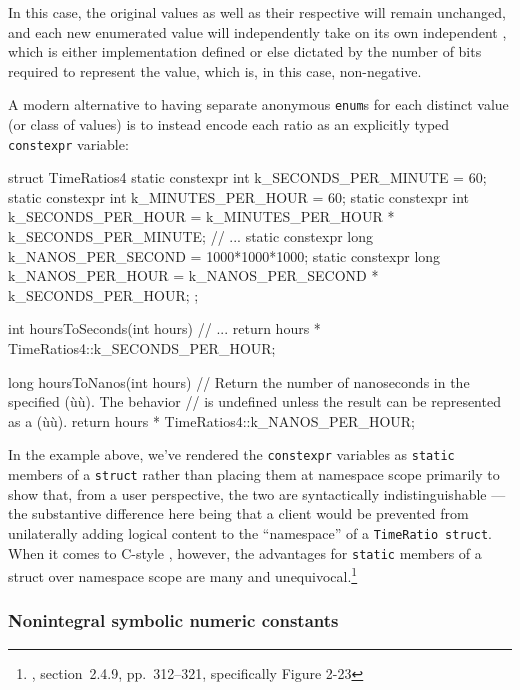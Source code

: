 \noindent In this case, the original values as well as their respective  will
remain unchanged, and each new enumerated value will independently take
on its own independent , which is either implementation defined or else
dictated by the number of bits required to represent the value, which
is, in this case, non-negative.

A modern alternative to having separate anonymous \lstinline!enum!s for
each distinct value (or class of values) is to instead encode each ratio
as an explicitly typed \lstinline!constexpr! variable:

\begin{emcppslisting}
struct TimeRatios4
{
    static constexpr int k_SECONDS_PER_MINUTE = 60;
    static constexpr int k_MINUTES_PER_HOUR   = 60;
    static constexpr int k_SECONDS_PER_HOUR   = k_MINUTES_PER_HOUR *
                                                k_SECONDS_PER_MINUTE;
    // ...
    static constexpr long k_NANOS_PER_SECOND  = 1000*1000*1000;
    static constexpr long k_NANOS_PER_HOUR    = k_NANOS_PER_SECOND *
                                                k_SECONDS_PER_HOUR;
};

int hoursToSeconds(int hours)
    // ...
{
    return hours * TimeRatios4::k_SECONDS_PER_HOUR;
}

long hoursToNanos(int hours)
    // Return the number of nanoseconds in the specified (ù{}ù).  The behavior
    // is undefined unless the result can be represented as a (ù{}ù).
{
    return hours * TimeRatios4::k_NANOS_PER_HOUR;
}
\end{emcppslisting}
    
\noindent In the example above, we've rendered the \lstinline!constexpr! variables as
\lstinline!static! members of a \lstinline!struct! rather than placing them at
namespace scope primarily to show that, from a user perspective, the two
are syntactically indistinguishable --- the substantive difference here
being that a client would be prevented from unilaterally adding logical
content to the ``namespace'' of a \lstinline!TimeRatio!~\lstinline!struct!.
When it comes to C-style , however, the
advantages for \lstinline!static! members of a struct over namespace scope
are many and \mbox{unequivocal}.{\cprotect\footnote{\cite{lakos20}, section~2.4.9, pp.~312--321, specifically Figure 2-23}}

\subsubsection[Nonintegral symbolic numeric constants]{Nonintegral symbolic numeric constants}\label{non-integral-symbolic-numeric-constants}

